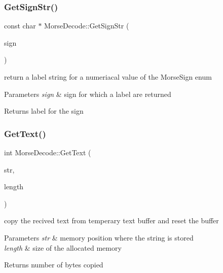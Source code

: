 \subsubsection{\texorpdfstring{Get\+Sign\+Str()}{GetSignStr()}}
{\footnotesize\ttfamily const char $\ast$ Morse\+Decode\+::\+Get\+Sign\+Str (\begin{DoxyParamCaption}\item[{Morse\+::\+Morse\+Sign}]{sign }\end{DoxyParamCaption})\hspace{0.3cm}{\ttfamily [static]}}



return a label string for a numeriacal value of the Morse\+Sign enum 


\begin{DoxyParams}{Parameters}
{\em sign} & sign for which a label are returned \\
\hline
\end{DoxyParams}
\begin{DoxyReturn}{Returns}
label for the sign 
\end{DoxyReturn}
\mbox{\label{classMorseDecode_a04e9d8784d2e7eec8f725a6e65344839}} 
\subsubsection{\texorpdfstring{Get\+Text()}{GetText()}}
{\footnotesize\ttfamily int Morse\+Decode\+::\+Get\+Text (\begin{DoxyParamCaption}\item[{char $\ast$}]{str,  }\item[{int}]{length }\end{DoxyParamCaption})}



copy the recived text from temperary text buffer and reset the buffer 


\begin{DoxyParams}{Parameters}
{\em str} & memory position where the string is stored \\
\hline
{\em length} & size of the allocated memory \\
\hline
\end{DoxyParams}
\begin{DoxyReturn}{Returns}
number of bytes copied 
\end{DoxyReturn}
\mbox{\label{classMorseDecode_a293ca5977883ebbd4266827491ddeae9}} 
